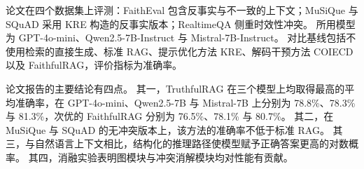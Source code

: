 论文在四个数据集上评测：FaithEval 包含反事实与不一致的上下文；MuSiQue 与 SQuAD 采用 KRE 构造的反事实版本；RealtimeQA 侧重时效性冲突。
所用模型为 GPT-4o-mini、Qwen2.5-7B-Instruct 与 Mistral-7B-Instruct。
对比基线包括不使用检索的直接生成、标准 RAG、提示优化方法 KRE、解码干预方法 COIECD 以及 FaithfulRAG，评价指标为准确率。

论文报告的主要结论有四点。
其一，TruthfulRAG 在三个模型上均取得最高的平均准确率，在 GPT-4o-mini、Qwen2.5-7B 与 Mistral-7B 上分别为 78.8\%、78.3\% 与 81.3\%，次优的 FaithfulRAG 分别为 76.5\%、78.1\% 与 80.7\%。
其二，在 MuSiQue 与 SQuAD 的无冲突版本上，该方法的准确率不低于标准 RAG。
其三，与自然语言上下文相比，结构化的推理路径使模型赋予正确答案更高的对数概率。
其四，消融实验表明图模块与冲突消解模块均对性能有贡献。
